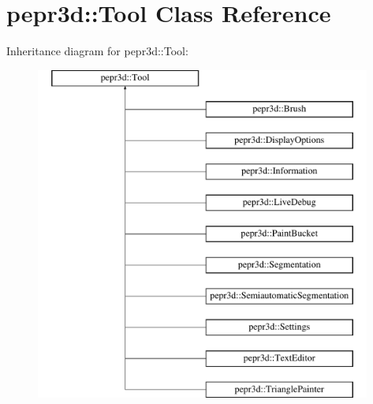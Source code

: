 \hypertarget{classpepr3d_1_1_tool}{}\section{pepr3d\+::Tool Class Reference}
\label{classpepr3d_1_1_tool}
Inheritance diagram for pepr3d\+::Tool\+:\begin{figure}[H]
\begin{center}
\leavevmode
\includegraphics[height=11.000000cm]{classpepr3d_1_1_tool}
\end{center}
\end{figure}
